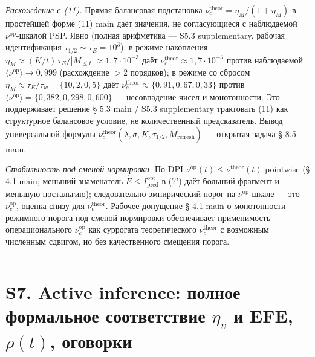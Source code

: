 \documentclass[pdflatex,sn-mathphys-ay]{sn-jnl}
\begin{document}
\emph{Расхождение с (11).} Прямая балансовая подстановка \(\nu_c^{\text{theor}} = \eta_M/(1+\eta_M)\) в простейшей форме (11) main даёт значения, не согласующиеся с наблюдаемой \(\nu^{\text{op}}\)-шкалой PSP. Явно (полная арифметика --- S5.3 supplementary, рабочая идентификация \(\tau_{1/2}\sim\tau_E=10^3\)): в режиме накопления \(\eta_M \approx (K/t)\,\tau_E/|M_{\le t}| \approx 1{,}7\cdot10^{-3}\) даёт \(\nu_c^{\text{theor}} \approx 1{,}7\cdot10^{-3}\) против наблюдаемой \(\langle\nu^{\text{op}}\rangle\to 0{,}999\) (расхождение \(>2\) порядков); в режиме со сбросом \(\eta_M \approx \tau_E/\tau_w = \{10, 2, 0{,}5\}\) даёт \(\nu_c^{\text{theor}} \approx \{0{,}91, 0{,}67, 0{,}33\}\) против \(\langle\nu^{\text{op}}\rangle = \{0{,}382, 0{,}298, 0{,}600\}\) --- несовпадение чисел и монотонности. Это поддерживает решение § 5.3 main / S5.3 supplementary трактовать (11) как структурное балансовое условие, не количественный предсказатель. Вывод универсальной формулы \(\nu_c^{\text{theor}}(\lambda, \sigma, K, \tau_{1/2}, \dot M_{\text{refresh}})\) --- открытая задача § 8.5 main.



\emph{Стабильность под сменой нормировки.} По DPI \(\nu^{\text{op}}(t) \le \nu^{\text{theor}}(t)\) pointwise (§ 4.1 main; меньший знаменатель \(\hat E \le I_{\text{pred}}^{\text{opt}}\) в (7') даёт больший фрагмент и меньшую ностальгию); следовательно эмпирический порог на \(\nu^{\text{op}}\)-шкале --- это \(\nu_c^{\text{op}}\), оценка снизу для \(\nu_c^{\text{theor}}\). Рабочее допущение § 4.1 main о монотонности режимного порога под сменой нормировки обеспечивает применимость операционального \(\nu_c^{\text{op}}\) как суррогата теоретического \(\nu_c^{\text{theor}}\) с возможным численным сдвигом, но без качественного смещения порога.



\begin{center}\rule{0.5\linewidth}{0.5pt}\end{center}



\section*{\texorpdfstring{S7. Active inference: полное формальное соответствие \(\eta_v\) и EFE, \(\rho(t)\), оговорки}{S7. Active inference: полное формальное соответствие \textbackslash eta\_v и EFE, \textbackslash rho(t), оговорки}}\label{s7.-active-inference-ux43fux43eux43bux43dux43eux435-ux444ux43eux440ux43cux430ux43bux44cux43dux43eux435-ux441ux43eux43eux442ux432ux435ux442ux441ux442ux432ux438ux435-eta_v-ux438-efe-rhot-ux43eux433ux43eux432ux43eux440ux43aux438}
\end{document}
